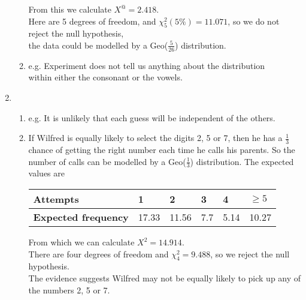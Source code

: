 \documentclass[fleqn]{article}
\begin{document}
\begin{enumerate}
\begin{enumerate}[label=\bfseries \alph*\space ]
                From this we calculate $X^@=2.418$.\\
                Here are 5 degrees of freedom, and $\chi_5^2(5\%)=11.071$, so we do not reject the null hypothesis, \\the data could be modelled by a Geo($\tfrac{5}{26}$) distribution.
            \item e.g. Experiment does not tell us anything about the distribution \\within either the consonant or the vowels.
        \end{enumerate}
    \item \begin{enumerate}[label=\bfseries \alph*\space ]
            \item e.g. It is unlikely that each guess will be independent of the others.
            \item If Wilfred is equally likely to select the digits 2, 5 or 7, then he has a $\tfrac{1}{3}$ chance of getting the right number each time he calls his parents. So the number of calls can be modelled by a Geo($\tfrac{1}{3}$) distribution. The expected values are \vspace{2mm}\\
                \begin{tabularx}{0.65\textwidth}{|X|*5{P{12mm}|}}
                    \hline
                    \textbf{Attempts}             & 1     & 2     & 3   & 4    & $\geq5$     \\\hline
                    \textbf{Expected frequency}   & 17.33 & 11.56 & 7.7 & 5.14 & 10.27       \\\hline
                \end{tabularx}\vspace{4mm}
                
                From which we can calculate $X^2=14.914$. \\
                There are four degrees of freedom and $\chi_4^2=9.488$, so we reject the null hypothesis. \\
                The evidence suggests Wilfred may not be equally likely to pick up any of the numbers 2, 5 or 7.
        \end{enumerate}
\end{enumerate}
\end{document}
